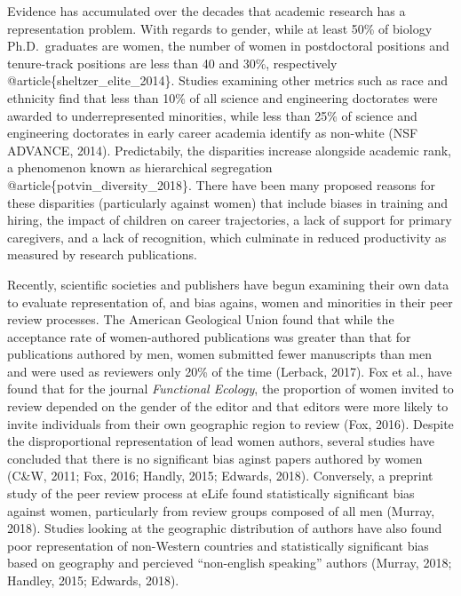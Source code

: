 \documentclass[11pt,]{article}
\begin{document}
Evidence has accumulated over the decades that academic research has a
representation problem. With regards to gender, while at least 50\% of
biology Ph.D.~graduates are women, the number of women in postdoctoral
positions and tenure-track positions are less than 40 and 30\%,
respectively @article\{sheltzer\_elite\_2014\}. Studies examining other
metrics such as race and ethnicity find that less than 10\% of all
science and engineering doctorates were awarded to underrepresented
minorities, while less than 25\% of science and engineering doctorates
in early career academia identify as non-white (NSF ADVANCE, 2014).
Predictabily, the disparities increase alongside academic rank, a
phenomenon known as hierarchical segregation
@article\{potvin\_diversity\_2018\}. There have been many proposed
reasons for these disparities (particularly against women) that include
biases in training and hiring, the impact of children on career
trajectories, a lack of support for primary caregivers, and a lack of
recognition, which culminate in reduced productivity as measured by
research publications.

Recently, scientific societies and publishers have begun examining their
own data to evaluate representation of, and bias agains, women and
minorities in their peer review processes. The American Geological Union
found that while the acceptance rate of women-authored publications was
greater than that for publications authored by men, women submitted
fewer manuscripts than men and were used as reviewers only 20\% of the
time (Lerback, 2017). Fox et al., have found that for the journal
\emph{Functional Ecology}, the proportion of women invited to review
depended on the gender of the editor and that editors were more likely
to invite individuals from their own geographic region to review (Fox,
2016). Despite the disproportional representation of lead women authors,
several studies have concluded that there is no significant bias aginst
papers authored by women (C\&W, 2011; Fox, 2016; Handly, 2015; Edwards,
2018). Conversely, a preprint study of the peer review process at eLife
found statistically significant bias against women, particularly from
review groups composed of all men (Murray, 2018). Studies looking at the
geographic distribution of authors have also found poor representation
of non-Western countries and statistically significant bias based on
geography and percieved ``non-english speaking'' authors (Murray, 2018;
Handley, 2015; Edwards, 2018).
\end{document}
